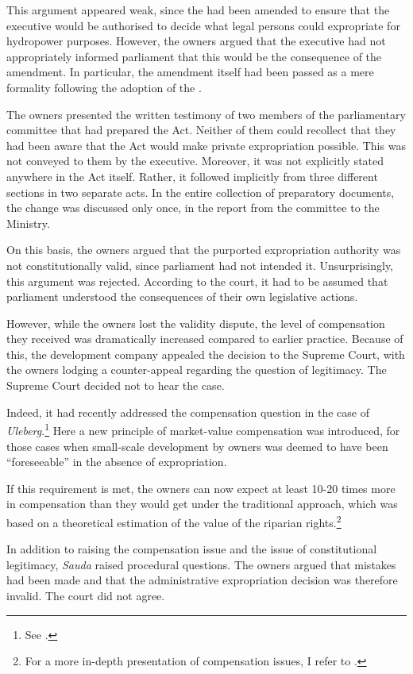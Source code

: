 This argument appeared weak, since the \cite{ea59} had been amended to ensure that the executive would be authorised to decide what legal persons could expropriate for hydropower purposes. However, the owners argued that the executive had not appropriately informed parliament that this would be the consequence of the amendment. In particular, the amendment itself had been passed as a mere formality following the adoption of the \cite{wra00}. 

The owners presented the written testimony of two members of the parliamentary committee that had prepared the Act. Neither of them could recollect that they had been aware that the Act would make private expropriation possible. This was not conveyed to them by the executive. Moreover, it was not explicitly stated anywhere in the Act itself. Rather, it followed implicitly from three different sections in two separate acts. In the entire collection of preparatory documents, the change was discussed only once, in the report from the committee to the Ministry. 

On this basis, the owners argued that the purported expropriation authority was not constitutionally valid, since parliament had not intended it. Unsurprisingly, this argument was rejected. According to the court, it had to be assumed that parliament understood the consequences of their own legislative actions. 

However, while the owners lost the validity dispute, the level of compensation they received was dramatically increased compared to earlier practice. Because of this, the development company appealed the decision to the Supreme Court, with the owners lodging a counter-appeal regarding the question of legitimacy. The Supreme Court decided not to hear the case. 

Indeed, it had recently addressed the compensation question in the case of {\it Uleberg}.\footnote{See \cite{uleberg08}.} Here a new principle of market-value compensation was introduced, for those cases when small-scale development by owners was deemed to have been ``foreseeable'' in the absence of expropriation.

If this requirement is met, the owners can now expect at least 10-20 times more in compensation than they would get under the traditional approach, which was based on a  theoretical estimation of the value of the riparian rights.\footnote{For a more in-depth presentation of compensation issues, I refer to \cite[71-76]{dyrkolbotn15}.}

In addition to raising the compensation issue and the issue of constitutional legitimacy, {\it Sauda} raised procedural questions. The owners argued that mistakes had been made and that the administrative expropriation decision was therefore invalid. The court did not agree. 

